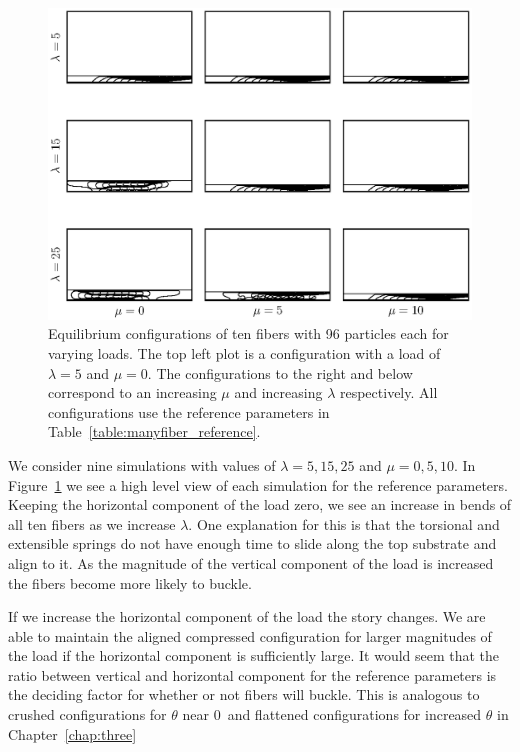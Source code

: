 	\begin{figure}
		\begin{center}
			\includegraphics[scale=1]{./fig/ch4/grid.eps}
		\end{center}		
		\caption{Equilibrium configurations of ten fibers with 96 particles each for varying loads. The top left plot is a configuration with a load of $\lambda = 5$ and $\mu = 0$. The configurations to the right and below correspond to an increasing $\mu$ and increasing $\lambda$ respectively. All configurations use the reference parameters in Table~\ref{table:manyfiber_reference}.
		\label{fig:grid}}
	\end{figure}
	
	We consider nine simulations with values of $\lambda = 5, 15, 25$ and $\mu = 0, 5, 10$. In Figure~\ref{fig:grid} we see a high level view of each simulation for the reference parameters. Keeping the horizontal component of the load zero, we see an increase in bends of all ten fibers as we increase $\lambda$. One explanation for this is that the torsional and extensible springs do not have enough time to slide along the top substrate and align to it. As the magnitude of the vertical component of the load is increased the fibers become more likely to buckle. 
	
	If we increase the horizontal component of the load the story changes. We are able to maintain the aligned compressed configuration for larger magnitudes of the load if the horizontal component is sufficiently large. It would seem that the ratio between vertical and horizontal component for the reference parameters is the deciding factor for whether or not fibers will buckle. This is analogous to crushed configurations for $\theta$ near $0$\textdegree\ and flattened configurations for increased $\theta$ in Chapter~\ref{chap:three} 

